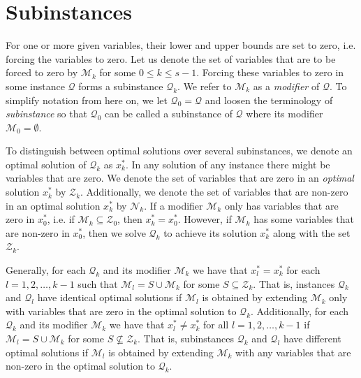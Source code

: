 \section{Subinstances}
For one or more given variables, their lower and upper bounds are set to zero,
i.e. forcing the variables to zero.
Let us denote the set of variables that are to be forced to zero by
$\mathcal{M}_k$ for some $0 \leq k \leq s - 1$.
Forcing these variables to zero in some instance $\mathcal{Q}$ forms
a subinstance $\mathcal{Q}_k$. We refer to $\mathcal{M}_k$ as a
\emph{modifier} of $\mathcal{Q}$.
To simplify notation from here on, we let
$\mathcal{Q}_0 = \mathcal{Q}$ and loosen the terminology of
\emph{subinstance} so that $\mathcal{Q}_0$ can be called a subinstance of
$\mathcal{Q}$ where its modifier $\mathcal{M}_0 = \emptyset$.

To distinguish between optimal solutions over several subinstances, we denote
an optimal solution of $\mathcal{Q}_k$ as $x_k^*$.
In any solution of any instance there might be variables that are zero.
We denote the set of variables that are zero in an \emph{optimal} solution
$x_k^*$ by $\mathcal{Z}_k$.
Additionally, we denote the set of variables that are non-zero in an 
optimal solution $x_k^*$ by $\mathcal{N}_k$.
If a modifier $\mathcal{M}_k$ only has variables that are zero in $x_0^*$,
i.e. if $\mathcal{M}_k \subseteq \mathcal{Z}_0$, then $x_k^* = x_0^*$. However,
if $\mathcal{M}_k$ has some variables that are non-zero in $x_0^*$, then
we solve $\mathcal{Q}_k$ to achieve its solution $x_k^*$ along with the set
$\mathcal{Z}_k$.

Generally, for each $\mathcal{Q}_k$ and its modifier $\mathcal{M}_k$ we
have that $x_l^* = x_k^*$ for each $l=1,2,\ldots,k-1$ such that
$\mathcal{M}_l = S \cup \mathcal{M}_k$ for some $S \subseteq \mathcal{Z}_k$.
That is, instances $\mathcal{Q}_k$ and $\mathcal{Q}_l$ have identical optimal
solutions if $\mathcal{M}_l$ is obtained by extending $\mathcal{M}_k$ only with
variables that are zero in the optimal solution to $\mathcal{Q}_k$.
Additionally, for each $\mathcal{Q}_k$ and its modifier $\mathcal{M}_k$ we
have that $x_l^* \neq x_k^*$ for all $l=1,2,\ldots,k-1$ if
$\mathcal{M}_l = S \cup \mathcal{M}_k$ for some $S\not\subseteq \mathcal{Z}_k$.
That is, subinstances $\mathcal{Q}_k$ and $\mathcal{Q}_l$ have different
optimal solutions if $\mathcal{M}_l$ is obtained by extending $\mathcal{M}_k$
with any variables that are non-zero in the optimal solution to
$\mathcal{Q}_k$.
